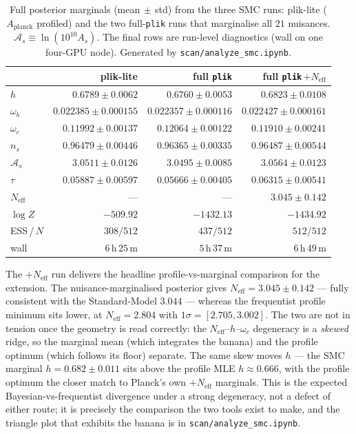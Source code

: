\documentclass[11pt]{article}
\newcommand{\code}[1]{\texttt{\small #1}}
\newcommand{\file}[1]{\texttt{\small #1}}
\newcommand{\Neff}{N_{\mathrm{eff}}}
\begin{document}
\begin{table}[h]
\centering
\caption{Full posterior marginals (mean$\,\pm\,$std) from the three SMC runs:
plik-lite ($A_{\mathrm{planck}}$ profiled) and the two full-\code{plik} runs
that marginalise all $21$ nuisances. $\mathcal A_s\equiv\ln(10^{10}A_s)$. The
final rows are run-level diagnostics (wall on one four-GPU node). Generated by
\file{scan/analyze\_smc.ipynb}.}
\label{tab:smc}
\begin{tabular}{lrrr}
\toprule
 & plik-lite & full \code{plik} & full \code{plik}\,$+\Neff$\\
\midrule
$h$            & $0.6789\pm0.0062$     & $0.6760\pm0.0053$     & $0.6823\pm0.0108$\\
$\omega_b$     & $0.022385\pm0.000155$ & $0.022357\pm0.000116$ & $0.022427\pm0.000161$\\
$\omega_c$     & $0.11992\pm0.00137$   & $0.12064\pm0.00122$   & $0.11910\pm0.00241$\\
$n_s$          & $0.96479\pm0.00446$   & $0.96365\pm0.00335$   & $0.96487\pm0.00544$\\
$\mathcal A_s$ & $3.0511\pm0.0126$     & $3.0495\pm0.0085$     & $3.0564\pm0.0123$\\
$\tau$         & $0.05887\pm0.00597$   & $0.05666\pm0.00405$   & $0.06315\pm0.00541$\\
$\Neff$        & ---                   & ---                   & $3.045\pm0.142$\\
\midrule
$\log Z$       & $-509.92$   & $-1432.13$  & $-1434.92$\\
ESS\,/\,$N$    & $308/512$   & $437/512$   & $512/512$\\
wall           & $6\,\mathrm{h}\,25\,\mathrm{m}$ & $5\,\mathrm{h}\,37\,\mathrm{m}$ & $6\,\mathrm{h}\,49\,\mathrm{m}$\\
\bottomrule
\end{tabular}
\end{table}

The $+\Neff$ run delivers the headline profile-vs-marginal comparison for the
extension. The nuisance-marginalised posterior gives $\Neff=3.045\pm0.142$ ---
fully consistent with the Standard-Model $3.044$ --- whereas the frequentist
profile minimum sits lower, at $\Neff=2.804$ with $1\sigma=[2.705,3.002]$. The
two are not in tension once the geometry is read correctly: the
$\Neff$--$h$--$\omega_c$ degeneracy is a \emph{skewed} ridge, so the marginal
mean (which integrates the banana) and the profile optimum (which follows its
floor) separate. The same skew moves $h$ --- the SMC marginal
$h=0.682\pm0.011$ sits above the profile MLE $h\approx0.666$, with the profile
optimum the closer match to Planck's own $+\Neff$ marginals. This is the
expected Bayesian-vs-frequentist divergence under a strong degeneracy, not a
defect of either route; it is precisely the comparison the two tools exist to
make, and the triangle plot that exhibits the banana is in
\file{scan/analyze\_smc.ipynb}.
\end{document}
